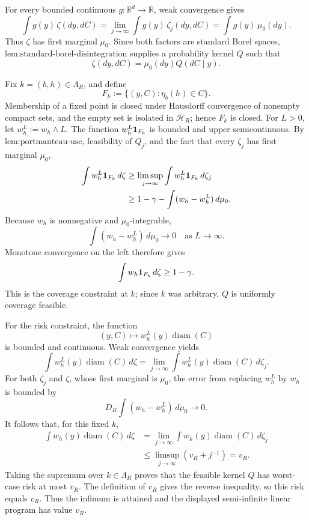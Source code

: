 For every bounded continuous \(g:\mathbb R^d\to\mathbb R\), weak convergence gives
\[
\int g(y)\,\zeta(dy,dC)
=\lim_{j\to\infty}\int g(y)\,\zeta_j(dy,dC)
=\int g(y)\,\mu_0(dy).
\]
Thus \(\zeta\) has first marginal \(\mu_0\).  Since both factors are standard Borel spaces, \(\text{lem:standard-borel-disintegration}\) supplies a probability kernel \(Q\) such that
\[
\zeta(dy,dC)=\mu_0(dy)Q(dC\mid y).
\]

Fix \(k=(b,h)\in\Lambda_R\), and define
\[
F_k:=\{(y,C):\eta_b(h)\in C\}.
\]
Membership of a fixed point is closed under Hausdorff convergence of nonempty compact sets, and the empty set is isolated in \(\mathcal H_R\); hence \(F_k\) is closed.  For \(L>0\), let \(w_h^L:=w_h\wedge L\).  The function \(w_h^L{\bf1}_{F_k}\) is bounded and upper semicontinuous.  By \(\text{lem:portmanteau-usc}\), feasibility of \(Q_j\), and the fact that every \(\zeta_j\) has first marginal \(\mu_0\),
\[
\begin{aligned}
\int w_h^L{\bf1}_{F_k}\,d\zeta
&\ge\limsup_{j\to\infty}\int w_h^L{\bf1}_{F_k}\,d\zeta_j\\
&\ge 1-\gamma-\int (w_h-w_h^L)\,d\mu_0.
\end{aligned}
\]
Because \(w_h\) is nonnegative and \(\mu_0\)-integrable,
\[
\int (w_h-w_h^L)\,d\mu_0\longrightarrow0
\quad\text{as }L\to\infty.
\]
Monotone convergence on the left therefore gives
\[
\int w_h{\bf1}_{F_k}\,d\zeta\ge1-\gamma.
\]
This is the coverage constraint at \(k\); since \(k\) was arbitrary, \(Q\) is uniformly coverage feasible.

For the risk constraint, the function
\[
(y,C)\longmapsto w_h^L(y)\operatorname{diam}(C)
\]
is bounded and continuous.  Weak convergence yields
\[
\int w_h^L(y)\operatorname{diam}(C)\,d\zeta
=\lim_{j\to\infty}
 \int w_h^L(y)\operatorname{diam}(C)\,d\zeta_j.
\]
For both \(\zeta_j\) and \(\zeta\), whose first marginal is \(\mu_0\), the error from replacing \(w_h^L\) by \(w_h\) is bounded by
\[
D_R\int(w_h-w_h^L)\,d\mu_0\longrightarrow0.
\]
It follows that, for this fixed \(k\),
\[
\begin{aligned}
\int w_h(y)\operatorname{diam}(C)\,d\zeta
&=\lim_{j\to\infty}
 \int w_h(y)\operatorname{diam}(C)\,d\zeta_j\\
&\le\limsup_{j\to\infty}(v_R+j^{-1})=v_R.
\end{aligned}
\]
Taking the supremum over \(k\in\Lambda_R\) proves that the feasible kernel \(Q\) has worst-case risk at most \(v_R\).  The definition of \(v_R\) gives the reverse inequality, so this risk equals \(v_R\).  Thus the infimum is attained and the displayed semi-infinite linear program has value \(v_R\).

